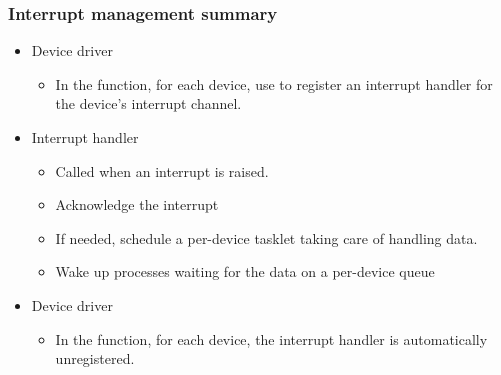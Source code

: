\begin{frame}
  \frametitle{Interrupt management summary}
  \begin{itemize}
  \item Device driver
    \begin{itemize}
    \item In the  function, for each device,
      use  to register an interrupt handler
      for the device's interrupt channel.
    \end{itemize}
  \item Interrupt handler
    \begin{itemize}
    \item Called when an interrupt is raised.
    \item Acknowledge the interrupt
    \item If needed, schedule a per-device tasklet taking care of handling
      data.
    \item Wake up processes waiting for the data on a per-device queue
    \end{itemize}
  \item Device driver
    \begin{itemize}
    \item In the  function, for each device, the
      interrupt handler is automatically unregistered.
    \end{itemize}
  \end{itemize}
\end{frame}

